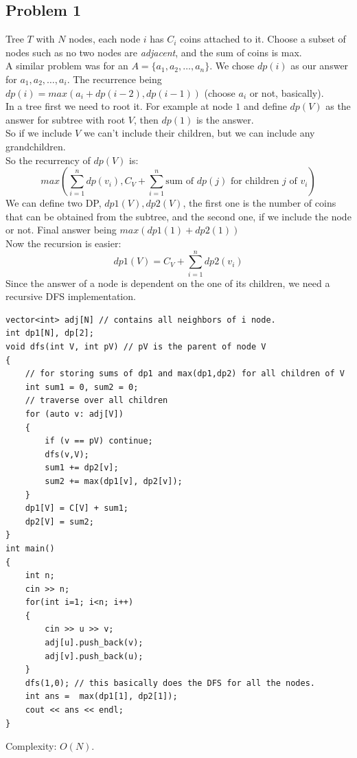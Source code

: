 \documentclass{IEEEtran}
\begin{document}
        \subsection{Problem 1}
            Tree $T$ with $N$ nodes, each node $i$ has $C_i$ coins attached to it. Choose a subset of nodes such as no two nodes are \textit{adjacent}, and the sum of coins is max.\\
            A similar problem was for an $A = \{a_1,a_2,\ldots,a_n\}$. We chose $dp(i)$ as our answer for $a_1,a_2,\ldots,a_i$. The recurrence being $dp(i) = max(a_i+dp(i-2),dp(i-1))$ (choose $a_i$ or not, basically).\\
            In a tree first we need to root it. For example at node $1$ and define $dp(V)$ as the answer for subtree with root $V$, then $dp(1)$ is the answer.\\
            So if we include $V$ we can't include their children, but we can include any grandchildren.\\
            So the recurrency  of $dp(V)$ is: $$max(\sum_{i=1}^n dp(v_i), C_V + \sum_{i=1}^n\text{sum of $dp(j)$ for children $j$ of $v_i$})$$
            We can define two DP, $dp1(V), dp2(V)$, the first one is the number of coins that can be obtained from the subtree, and the second one, if we include the node or not. Final answer being $max(dp1(1) + dp2(1))$\\
            Now the recursion is easier: $$dp1(V) = C_V + \sum_{i=1}^ndp2(v_i)$$
            Since the answer of a node is dependent on the one of its children, we need a recursive DFS implementation.
            \begin{lstlisting}
vector<int> adj[N] // contains all neighbors of i node.
int dp1[N], dp[2]; 
void dfs(int V, int pV) // pV is the parent of node V
{
    // for storing sums of dp1 and max(dp1,dp2) for all children of V
    int sum1 = 0, sum2 = 0; 
    // traverse over all children
    for (auto v: adj[V])
    {
        if (v == pV) continue;
        dfs(v,V);
        sum1 += dp2[v];
        sum2 += max(dp1[v], dp2[v]);
    }
    dp1[V] = C[V] + sum1;
    dp2[V] = sum2; 
}
int main()
{
    int n;
    cin >> n;
    for(int i=1; i<n; i++)
    {
        cin >> u >> v;
        adj[u].push_back(v);
        adj[v].push_back(u);
    }
    dfs(1,0); // this basically does the DFS for all the nodes.
    int ans =  max(dp1[1], dp2[1]);
    cout << ans << endl; 
}
            \end{lstlisting}
            Complexity: $O(N)$.
\end{document}
